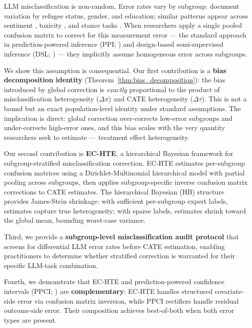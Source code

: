 \documentclass[11pt,a4paper]{article}
\begin{document}
LLM misclassification is non-random.
Error rates vary by subgroup: \citet{ashwin2025} document variation by refugee status, gender, and education; similar patterns appear across sentiment \citep{gilardi2023}, toxicity \citep{tornberg2024}, and stance tasks \citep{ziems2024}.
When researchers apply a single pooled confusion matrix to correct for this measurement error --- the standard approach in prediction-powered inference (PPI; \citealp{angelopoulos2023}) and design-based semi-supervised inference (DSL; \citealp{egami2024}) --- they implicitly assume homogeneous error across subgroups.

We show this assumption is consequential.
Our first contribution is a \textbf{bias decomposition identity} (Theorem~\ref{thm:bias_decomposition}): the bias introduced by global correction is \emph{exactly} proportional to the product of misclassification heterogeneity ($\Delta\pi$) and CATE heterogeneity ($\Delta\tau$).
This is not a bound but an exact population-level identity under standard assumptions.
The implication is direct: global correction over-corrects low-error subgroups and under-corrects high-error ones, and this bias scales with the very quantity researchers seek to estimate --- treatment effect heterogeneity.

Our second contribution is \textbf{EC-HTE}, a hierarchical Bayesian framework for subgroup-stratified misclassification correction.
EC-HTE estimates per-subgroup confusion matrices using a Dirichlet-Multinomial hierarchical model with partial pooling across subgroups, then applies subgroup-specific inverse confusion matrix corrections to CATE estimates.
The hierarchical Bayesian (HB) structure provides James-Stein shrinkage: with sufficient per-subgroup expert labels, estimates capture true heterogeneity; with sparse labels, estimates shrink toward the global mean, bounding worst-case variance.

Third, we provide a \textbf{subgroup-level misclassification audit protocol} that screens for differential LLM error rates before CATE estimation, enabling practitioners to determine whether stratified correction is warranted for their specific LLM-task combination.

Fourth, we demonstrate that EC-HTE and prediction-powered confidence intervals (PPCI; \citealp{sui2026}) are \textbf{complementary}: EC-HTE handles structured covariate-side error via confusion matrix inversion, while PPCI rectifiers handle residual outcome-side error.
Their composition achieves best-of-both when both error types are present.
\end{document}
